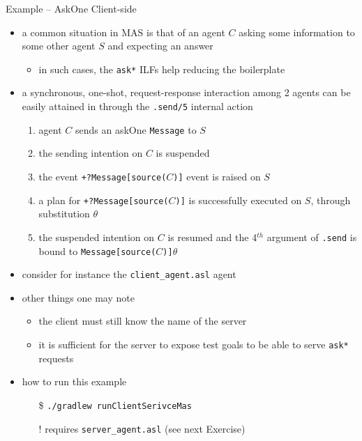 \documentclass[presentation]{beamer}\mode<presentation>{\usetheme{AMSBolognaFC}}
\begin{document}
\startExercise
\begin{frame}[c, allowframebreaks]{Example \currentExercise{} -- AskOne Client-side}
\begin{itemize}
    
    \item a common situation in MAS is that of an agent $C$ asking some information to some other agent $S$ and expecting an answer
    \begin{itemize}
        \item in such cases, the \texttt{\texttt{ask*}} ILFs help reducing the boilerplate
    \end{itemize}
    
    \vspace{.3cm}
    
    \item a synchronous, one-shot, request-response interaction among 2 agents can be easily attained in \jason{} through the \texttt{.send/5} internal action
    \begin{enumerate}
        \item agent $C$ sends an \alert{askOne} \texttt{Message} to $S$
        \item the sending intention on $C$ is suspended 
        \item the event \texttt{+?Message[source($C$)]} event is raised on $S$
        \item a plan for \texttt{+?Message[source($C$)]} is successfully executed on $S$, through substitution $\theta$
        \item the suspended intention on $C$ is resumed and the 4$^{th}$ argument of \texttt{.send} is bound to \texttt{Message[source($C$)]$\theta$}
     \end{enumerate}
    
    \framebreak
    
    \item consider for instance the \texttt{client\_agent.asl} agent
    
    
    \framebreak
    
    \item other things one may note
    \begin{itemize}
        \item the client must still know the name of the server
        \item it is sufficient for the server to expose test goals to be able to serve \texttt{ask*} requests
    \end{itemize}
    
    \vspace{.3cm}
    
    \item how to run this example
    \begin{itemize}
        \item[\$] \texttt{./gradlew run\alert{ClientSerivce}Mas}
        \item[!] requires \texttt{server\_agent.asl} (see next Exercise) 
    \end{itemize}
    
\end{itemize}
\end{frame}
\end{document}
